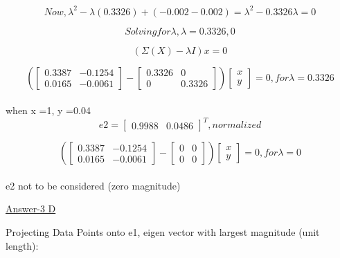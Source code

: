 \documentclass{report}
\begin{document}
\begin{flushleft}
\begin{equation}
Now, \lambda^2 - \lambda(0.3326) + (-0.002-0.002) = \lambda^2 - 0.3326\lambda = 0
\end{equation}

\[
Solving for \lambda, \lambda = 0.3326, 0
\]

\begin{equation}
(\Sigma (X) - \lambda I)x = 0
\end{equation}

\begin{equation}
(\begin{bmatrix}
0.3387 & -0.1254 \\
0.0165 & -0.0061
\end{bmatrix} - 
\begin{bmatrix}
0.3326 & 0 \\
0 & 0.3326
\end{bmatrix})
\begin{bmatrix}
x \\
y
\end{bmatrix}
= 0, for \lambda = 0.3326
\end{equation} \\

when x =1, y =0.04 \\
\[
e2 = \begin{bmatrix}0.9988 & 0.0486\end{bmatrix}^T, normalized
\] \linebreak[2]

\begin{equation}
(\begin{bmatrix}
0.3387 & -0.1254 \\
0.0165 & -0.0061
\end{bmatrix} - 
\begin{bmatrix}
0 & 0 \\
0 & 0
\end{bmatrix})
\begin{bmatrix}
x \\
y
\end{bmatrix}
= 0, for \lambda = 0
\end{equation} \\

e2 not to be considered (zero magnitude) \linebreak[2]

\underline {Answer-3 D}  \linebreak[2]

Projecting Data Points onto e1, eigen vector with largest magnitude (unit length):


\end{flushleft}
\end{document}

